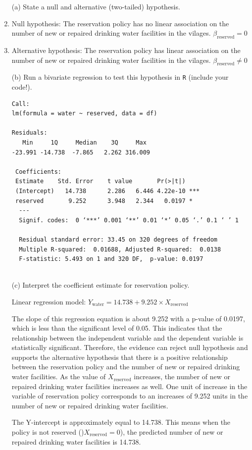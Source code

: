 \documentclass[12pt,letterpaper]{article}
\begin{document}
\newpage
\begin{enumerate}
	\item [(a)] State a null and alternative (two-tailed) hypothesis. 
	
	\item Null hypothesis:  The reservation policy has no linear association on the number of new or repaired drinking water facilities in the vilages. \( \beta_{\text{reserved}} = 0 \)
	
	\item Alternative hypothesis:  The reservation policy has linear association on the number of new or repaired drinking water facilities in the vilages.  \( \beta_{\text{reserved}} \neq 0 \)
	
	\vspace{6cm}
	\item [(b)] Run a bivariate regression to test this hypothesis in \texttt{R} (include your code!).
	
				  
				
		\begin{verbatim}
Call:
lm(formula = water ~ reserved, data = df)

Residuals:    
   Min     1Q     Median    3Q     Max 
-23.991 -14.738  -7.865   2.262 316.009

 Coefficients:            
 Estimate    Std. Error    t value       Pr(>|t|)    
 (Intercept)   14.738      2.286   6.446 4.22e-10 ***
 reserved       9.252      3.948   2.344   0.0197 * 
  ---
  Signif. codes:  0 ‘***’ 0.001 ‘**’ 0.01 ‘*’ 0.05 ‘.’ 0.1 ‘ ’ 1
  
  Residual standard error: 33.45 on 320 degrees of freedom
  Multiple R-squared:  0.01688,	Adjusted R-squared:  0.0138 
  F-statistic: 5.493 on 1 and 320 DF,  p-value: 0.0197
  
	   \end{verbatim}
	
	
	\vspace{6cm}
	\item [(c)] Interpret the coefficient estimate for reservation policy. 
	
		
	\vspace{.25cm}
	
	\noindent Linear regression model: $Y_{\text{water}} = 14.738 + 9.252 \times X_{\text{reserved}}$
	
	The slope of this regression equation is about 9.252 with a p-value of 0.0197, which is less than the significant level of 0.05. This indicates that the relationship between the independent variable and the dependent variable is statistically significant. Therefore, the evidence can reject null hypothesis and supports the alternative hypothesis that there is a positive relationship between the reservation policy and the number of new or repaired drinking water facilities.  As the value of $X_{\text{reserved}}$ increases, the number of new or repaired drinking water facilities increases as well. One unit of increase in the variable of reservation policy corresponds to an increases of 9.252 units in the number of new or repaired drinking water facilities.
	
	The Y-intercept is approximately equal to 14.738. This means when the policy is not reserved ()$X_{\text{reserved}} = 0$), the predicted number of new or repaired drinking water facilities is 14.738.
\end{enumerate}
\end{document}
